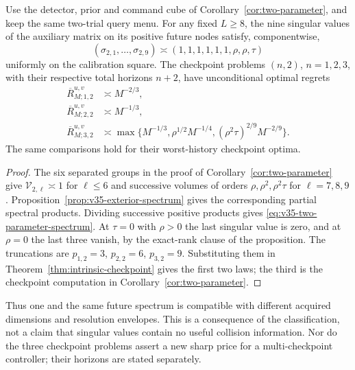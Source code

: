 \begin{corollary}
\label{cor:v35-fixed-future}
Use the detector, prior and command cube of
Corollary~\ref{cor:two-parameter}, and keep the same two-trial query
menu. For any fixed $L\ge8$, the nine singular values of the
auxiliary matrix on its positive future nodes satisfy, componentwise,
\begin{equation}\label{eq:v35-two-parameter-spectrum}
 (\sigma_{2,1},\ldots,\sigma_{2,9})
       \asymp(1,1,1,1,1,1,\rho,\rho,\tau)
\end{equation}
uniformly on the calibration square. The checkpoint problems
$(n,2)$, $n=1,2,3$, with their respective total horizons $n+2$,
have unconditional optimal regrets
\begin{equation}\label{eq:v35-fixed-future}
 \begin{split}
 \overline R_{M;1,2}^{u,v}&\asymp M^{-2/3},\\
 \overline R_{M;2,2}^{u,v}&\asymp M^{-1/3},\\
 \overline R_{M;3,2}^{u,v}&\asymp
  \max\{M^{-1/3},\rho^{1/2}M^{-1/4},
                       (\rho^2\tau)^{2/9}M^{-2/9}\}.
 \end{split}
\end{equation}
The same comparisons hold for their worst-history checkpoint optima.
\end{corollary}
\begin{proof}
The six separated groups in the proof of
Corollary~\ref{cor:two-parameter} give
$\mathcal V_{2,\ell}\asymp1$ for $\ell\le6$ and successive
volumes of orders $\rho,\rho^2,\rho^2\tau$ for $\ell=7,8,9$.
Proposition~\ref{prop:v35-exterior-spectrum} gives the corresponding
partial spectral products. Dividing successive positive products
gives \eqref{eq:v35-two-parameter-spectrum}. At $\tau=0$ with
$\rho>0$ the last singular value is zero, and at $\rho=0$ the last
three vanish, by the exact-rank clause of the proposition.
The truncations are $p_{1,2}=3$, $p_{2,2}=6$, $p_{3,2}=9$.
Substituting them in Theorem~\ref{thm:intrinsic-checkpoint} gives
the first two laws; the third is the checkpoint computation in
Corollary~\ref{cor:two-parameter}.
\end{proof}

Thus one and the same future spectrum is compatible with different
acquired dimensions and resolution envelopes. This is a consequence
of the classification, not a claim that singular values contain no
useful collision information. Nor do the three checkpoint problems
assert a new sharp price for a multi-checkpoint controller; their
horizons are stated separately.

